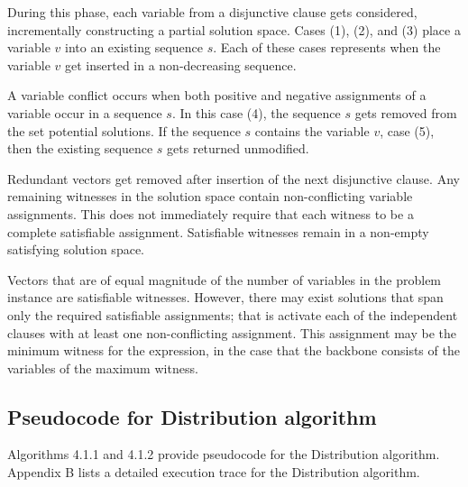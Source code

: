 \FloatBarrier

		
During this phase, each variable from a disjunctive clause gets considered, incrementally constructing a partial solution space.  Cases (1), (2), and (3) place a variable $v$ into an existing sequence $s$.  Each of these cases represents when the variable $v$ get inserted in a non-decreasing sequence.

A variable conflict occurs when both positive and negative assignments of a variable occur in a sequence $s$.  In this case (4), the sequence $s$ gets removed from the set potential solutions.  If the sequence $s$ contains the variable $v$, case (5), then the existing sequence $s$ gets returned unmodified.

Redundant vectors get removed after insertion of the next disjunctive clause.  Any remaining witnesses in the solution space contain non-conflicting variable assignments.  This does not immediately require that each witness to be a complete satisfiable assignment. Satisfiable witnesses remain in a non-empty satisfying solution space.
		
		




Vectors that are of equal magnitude of the number of variables in the problem instance are satisfiable witnesses.  However, there may exist solutions that span only the required satisfiable assignments; that is activate each of the independent clauses with at least one non-conflicting assignment.  This assignment may be the minimum witness for the expression, in the case that the backbone consists of the variables of the maximum witness.

		
	\subsection{Pseudocode for Distribution algorithm}

Algorithms 4.1.1 and 4.1.2 provide pseudocode for the Distribution algorithm.  Appendix B lists a detailed execution trace for the Distribution algorithm.





%
%
%	


